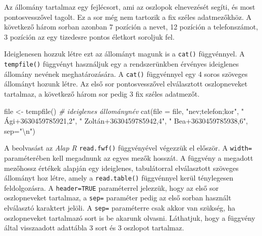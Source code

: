 \documentclass[
]{book}
\newenvironment{Shaded}{\begin{snugshade}}{\end{snugshade}}
\newcommand{\AttributeTok}[1]{\textcolor[rgb]{0.77,0.63,0.00}{#1}}
\newcommand{\CommentTok}[1]{\textcolor[rgb]{0.56,0.35,0.01}{\textit{#1}}}
\newcommand{\FunctionTok}[1]{\textcolor[rgb]{0.00,0.00,0.00}{#1}}
\newcommand{\NormalTok}[1]{#1}
\newcommand{\OtherTok}[1]{\textcolor[rgb]{0.56,0.35,0.01}{#1}}
\newcommand{\SpecialCharTok}[1]{\textcolor[rgb]{0.00,0.00,0.00}{#1}}
\newcommand{\StringTok}[1]{\textcolor[rgb]{0.31,0.60,0.02}{#1}}
\begin{document}
Az állomány tartalmaz egy fejlécsort, ami az oszlopok elnevezését segíti, és most pontosvesszővel tagolt. Ez a sor még nem tartozik a fix széles adatmezőkhöz. A következő három sorban azonban 7 pozíción a nevet, 12 pozíción a telefonszámot, 3 pozíción az egy tizedesre pontos életkort soroljuk fel.

Ideiglenesen hozzuk létre ezt az állományt magunk is a \texttt{cat()} függvénnyel. A \texttt{tempfile()} függvényt használjuk egy a rendszerünkben érvényes ideiglenes állomány nevének meghatározására. A \texttt{cat()} függvénnyel egy 4 soros szöveges állományt hozunk létre. Az első sor pontosvesszővel elválasztott oszlopneveket tartalmaz, a következő három sor pedig 3 fix széles adatmezőt.

\begin{Shaded}
\begin{Highlighting}[]
\NormalTok{file }\OtherTok{\textless{}{-}} \FunctionTok{tempfile}\NormalTok{()  }\CommentTok{\# ideiglenes állománynév}
\FunctionTok{cat}\NormalTok{(}\AttributeTok{file =}\NormalTok{ file, }\StringTok{"nev;telefon;kor"}\NormalTok{,}
                 \StringTok{"    Ági+3630459785921,2"}\NormalTok{,}
                 \StringTok{" Zoltán+3630459785942,4"}\NormalTok{, }
                 \StringTok{"    Bea+3630459785938,6"}\NormalTok{, }\AttributeTok{sep=}\StringTok{"}\SpecialCharTok{\textbackslash{}n}\StringTok{"}\NormalTok{)}
\end{Highlighting}
\end{Shaded}

A beolvasást az \emph{Alap R} \texttt{read.fwf()} függvényével végezzük el először. A \texttt{width=} paraméterében kell megadnunk az egyes mezők hosszát. A függvény a megadott mezőhossz értékek alapján egy ideiglenes, tabulátorral elválasztott szöveges állományt hoz létre, amely a \texttt{read.table()} függvénnyel kerül ténylegesen feldolgozásra. A \texttt{header=TRUE} paraméterrel jelezzük, hogy az első sor oszlopneveket tartalmaz, a \texttt{sep=} paraméter pedig az első sorban használt elválasztó karaktert jelöli. A \texttt{sep=} paraméterre csak akkor van szükség, ha oszlopneveket tartalmazó sort is be akarunk olvasni. Láthatjuk, hogy a függvény által visszaadott adattábla 3 sort és 3 oszlopot tartalmaz.
\end{document}
